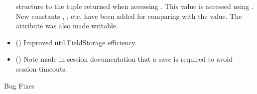 \begin{itemize}
      structure to the tuple returned when accessing .
      This value is accessed using .
      New constants , ,
       etc, have been added for comparing with the
       value. The  attribute
      was also made writable.
    \item
      ()
      Improved util.FieldStorage efficiency.
    \item
      ()
      Note made in session documentation that a save is required to avoid
      session timeouts.
  \end{itemize}

  Bug Fixes

